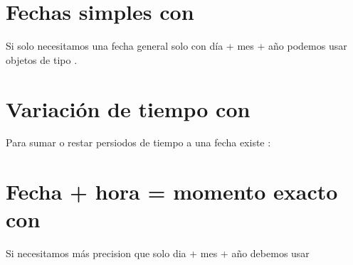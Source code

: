 \documentclass[a5paper,9pt,spanish]{sphinxmanual}
\begin{document}
\section{Fechas simples con }
\label{\detokenize{datetime:fechas-simples-con-date}}
\sphinxAtStartPar
Si solo necesitamos una fecha general solo con día + mes + año podemos usar
objetos de tipo .

\begin{sphinxVerbatim}[commandchars=\\\{\}]
   

  

    
\end{sphinxVerbatim}


\section{Variación de tiempo con }
\label{\detokenize{datetime:variacion-de-tiempo-con-timedelta}}
\sphinxAtStartPar
Para sumar o restar persiodos de tiempo a una fecha existe :

\begin{sphinxVerbatim}[commandchars=\\\{\}]
    
  
    
\end{sphinxVerbatim}


\section{Fecha + hora = momento exacto con }
\label{\detokenize{datetime:fecha-hora-momento-exacto-con-datetime}}
\sphinxAtStartPar
Si necesitamos más precision que solo dia + mes + año debemos usar 
\end{document}
